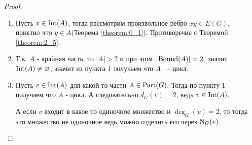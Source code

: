 \begin{proof}
	\begin{enumerate}
		\item Пусть $x \in \operatorname{Int}(A)$, тогда рассмотрим произвольное ребро  $xy \in E(G)$, понятно что  $y \in A$(Теорема \ref{theorem:0_1}).
			Противоречие с Теоремой \ref{theorem:2_5}.
		\item Т.к. $A$ - крайняя часть, то $|A| > 2$ и при этом  $|\operatorname{Bound}(A)| = 2$, значит $\operatorname{Int}(A) \neq \varnothing$, значит из пункта 1 получаем что $A$ ~-- цикл.
		\item  Пусть $v \in \operatorname{Int}(A)$ для какой то части $A \in \operatorname{Part}(G)$.
			Тогда по пункту 1 получаем что $A$ - цикл.
			А следовательно  $d_G(v) = 2$, ведь $v \in \operatorname{Int}(A)$.

			А если $v$ входит в какое то одиночное множество и $\deg_G(v) = 2$, то тогда это множество не одиночное ведь можно отделить его через  $\operatorname{N}_G(v)$.
	\end{enumerate}
\end{proof}


